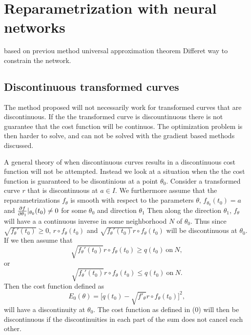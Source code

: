 
\section{Reparametrization with neural networks}
based on previou method
universal approximation theorem
Differet way to constrain the network.

\subsection{Discontinuous transformed curves}
The method proposed will not necessarily work for transformed curves that are discontinuous. If the the transformed curve is discountinuous there is not guarantee that the cost function will be continuos. The optimization problem is then harder to solve, and can not be solved with the gradient based methods discussed.

A general theory of when discontinuous curves results in a discontinuous cost function will not be attempted. Instead we look at a situation when the the cost function is guaranteed to be disontinious at a point \(\theta_0\). Consider a transformed curve  \(r\) that is discontinuous at  \(a \in I\). We furthermore assume that the reparametrizations  \(f_{\theta}\) is smooth with respect to the parameters  \(\theta\),  \(f_{\theta_0}(t_0)=a\) and   \(\pdv{f}{\theta_1}|_{\theta_0}(t_0)\neq 0\) for some  \(\theta_0\) and direction  \(\theta_1\) Then along the direction  \(\theta_1\),  \(f_{\theta}\) will have a a continuous inverse in some neighborhood  \(N\) of  \(\theta_0\). Thus  since \(\sqrt{f_{\theta}'(t_0)} \geq 0\), \(r \circ f_\theta(t_0)\) and  \(\sqrt{f_{\theta}'(t_0)} r \circ f_\theta(t_0)\) will be discontinuous at \(\theta_0\). If we then assume that
\begin{equation}
  \sqrt{f_{\theta}'(t_0)} r \circ f_\theta(t_0) \geq  q(t_0)\ \text{on} \ N,
\end{equation}
or
\begin{equation}
  \sqrt{f_{\theta}'(t_0)} r \circ f_\theta(t_0) \leq q(t_0) \ \text{on} \ N.
\end{equation}
Then the cost function defined as
\begin{equation}
  E_0(\theta) = \big[q(t_0) - \sqrt{f'_{\theta}} r \circ f_{\theta}(t_0)\big]^2,
\end{equation}
will have a discontinuity at  \(\theta_0\). The cost function as defined in (0) will then be discontinuous if the discontinuities in each part of the sum does not cancel each other.

